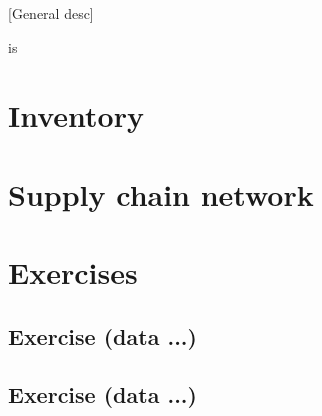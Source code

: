 \documentclass[11pt]{article}
\begin{document}
\maketitle

[General desc]

\company is 

\section{Inventory }

\section{Supply chain network}

\section{Exercises}

\subsection{Exercise (data ...)}

\subsection{Exercise (data ...)}
\end{document}
